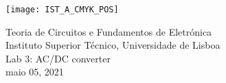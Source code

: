 
\thispagestyle {empty}

\texttt{[image: IST\_A\_CMYK\_POS]}

\begin{center}
%
\vspace{1.0cm}

\vspace{1cm}
{\FontLb Teoria de Circuitos e Fundamentos de Eletrónica} \\ %
\vspace{1cm}
{\FontSn Instituto Superior Técnico, Universidade de Lisboa} \\ %
\vspace{1cm}
{\FontSn Lab 3: AC/DC converter} \\
\vspace{1cm}
{\FontSn  maio 05, 2021} \\ %
%
\end{center}

